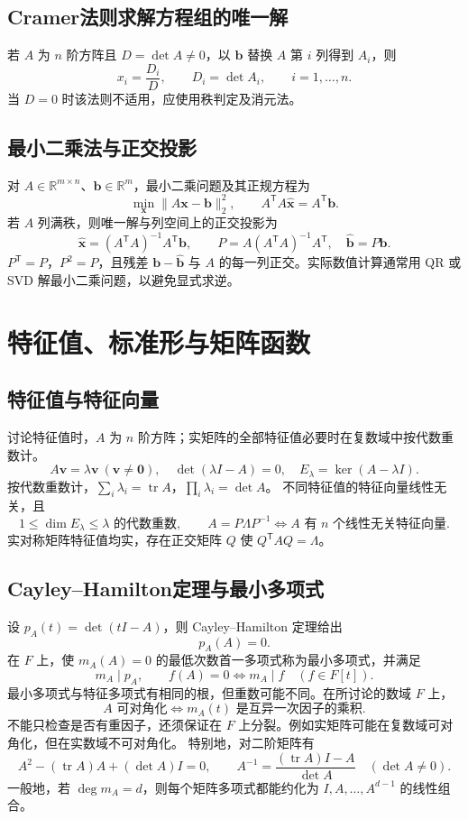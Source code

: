 \documentclass[../main.tex]{subfiles}
\begin{document}
\subsection{Cramer法则求解方程组的唯一解}
若 $A$ 为 $n$ 阶方阵且 $D=\det A\ne0$，以 $\bm b$ 替换 $A$ 第 $i$ 列得到 $A_i$，则
\[
x_i=\frac{D_i}{D},\qquad D_i=\det A_i,\qquad i=1,\ldots,n.
\]
当 $D=0$ 时该法则不适用，应使用秩判定及消元法。
\subsection{最小二乘法与正交投影}
对 $A\in\mathbb R^{m\times n}$、$\bm b\in\mathbb R^m$，最小二乘问题及其正规方程为
\[
\min_{\bm x}\|A\bm x-\bm b\|_2^2,\qquad
A^{\mathsf T}A\widehat{\bm x}=A^{\mathsf T}\bm b.
\]
若 $A$ 列满秩，则唯一解与列空间上的正交投影为
\[
\widehat{\bm x}=(A^{\mathsf T}A)^{-1}A^{\mathsf T}\bm b,\qquad
P=A(A^{\mathsf T}A)^{-1}A^{\mathsf T},\quad\widehat{\bm b}=P\bm b.
\]
$P^{\mathsf T}=P$，$P^2=P$，且残差 $\bm b-\widehat{\bm b}$ 与 $A$ 的每一列正交。实际数值计算通常用 QR 或 SVD 解最小二乘问题，以避免显式求逆。
\section{特征值、标准形与矩阵函数}
\subsection{特征值与特征向量}
讨论特征值时，$A$ 为 $n$ 阶方阵；实矩阵的全部特征值必要时在复数域中按代数重数计。
\[
A\bm v=\lambda\bm v\ (\bm v\ne\bm0),\quad
\det(\lambda I-A)=0,\quad E_\lambda=\ker(A-\lambda I).
\]
按代数重数计，$\sum_i\lambda_i=\operatorname{tr}A$，$\prod_i\lambda_i=\det A$。
不同特征值的特征向量线性无关，且
\[
1\le\dim E_\lambda\le\lambda\text{ 的代数重数},\qquad
A=P\Lambda P^{-1}\iff A\text{ 有 }n\text{ 个线性无关特征向量}.
\]
实对称矩阵特征值均实，存在正交矩阵 $Q$ 使 $Q^{\mathsf T}AQ=\Lambda$。
\subsection{Cayley--Hamilton定理与最小多项式}
设 $p_A(t)=\det(tI-A)$，则 Cayley--Hamilton 定理给出
\[
p_A(A)=0.
\]
在 $F$ 上，使 $m_A(A)=0$ 的最低次数首一多项式称为最小多项式，并满足
\[
m_A\mid p_A,\qquad
f(A)=0\iff m_A\mid f\quad(f\in F[t]).
\]
最小多项式与特征多项式有相同的根，但重数可能不同。在所讨论的数域 $F$ 上，
\[
A\text{ 可对角化}\iff
m_A(t)\text{ 是互异一次因子的乘积}.
\]
不能只检查是否有重因子，还须保证在 $F$ 上分裂。例如实矩阵可能在复数域可对角化，但在实数域不可对角化。
特别地，对二阶矩阵有
\[
A^2-(\operatorname{tr}A)A+(\det A)I=0,
\qquad A^{-1}=\frac{(\operatorname{tr}A)I-A}{\det A}\quad(\det A\ne0).
\]
一般地，若 $\deg m_A=d$，则每个矩阵多项式都能约化为 $I,A,\ldots,A^{d-1}$ 的线性组合。
\end{document}
